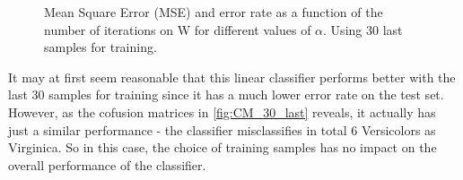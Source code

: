 \documentclass{article}
\begin{document}
\begin{figure}
    \centering
    \caption{Mean Square Error (MSE) and error rate as a function of the number of iterations on W
    for different values of $\alpha$. Using 30 last samples for training.}
\end{figure}

It may at first seem reasonable that this linear classifier performs better with the last 30 samples for training
since it  has a much lower error rate on the test set. However, as the cofusion matrices in \autoref{fig:CM_30_last}
reveals, it actually has just a similar performance - the classifier misclassifies in total 6 Versicolors as
Virginica. So in this case, the choice of training samples has no impact on the overall performance of the
classifier.
\end{document}

